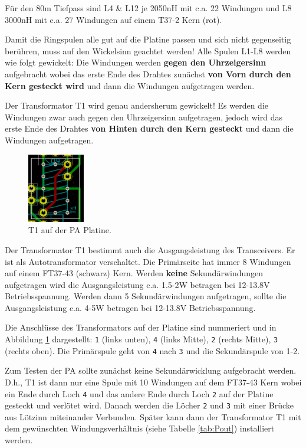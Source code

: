 \documentclass[10pt, a4paper]{paper}
\newcommand{\warn}[1]{{\color{red} #1}}
\newcommand{\con}[1]{\texttt{#1}}
\begin{document}
Für den 80m Tiefpass sind L4 \& L12 je 2050nH mit c.a. 22 Windungen und L8 3000nH mit c.a. 27 Windungen auf einem T37-2 Kern (rot).

Damit die Ringspulen alle gut auf die Platine passen und sich nicht gegenseitig berühren, \warn{muss auf den Wickelsinn geachtet werden!} Alle Spulen L1-L8 werden wie folgt gewickelt: Die Windungen werden \textbf{gegen den Uhrzeigersinn} aufgebracht wobei das erste Ende des Drahtes zunächst \textbf{von Vorn durch den Kern gesteckt wird} und dann die Windungen aufgetragen werden. 

\warn{Der Transformator T1 wird genau andersherum gewickelt!} Es werden die Windungen zwar auch gegen den Uhrzeigersinn aufgetragen, jedoch wird das erste Ende des Drahtes \textbf{von Hinten durch den Kern gesteckt} und dann die Windungen aufgetragen. 

\begin{figure}
 \centering
 \includegraphics[width=2.5cm]{fig/T1.png}
 \caption{T1 auf der PA Platine.} \label{fig:T1}
\end{figure}
Der Transformator T1 bestimmt auch die Ausgangsleistung des Transceivers. Er ist als Autotransformator verschaltet. Die Primärseite hat immer 8 Windungen auf einem FT37-43 (schwarz) Kern. Werden \textbf{keine} Sekundärwindungen aufgetragen wird die Ausgangsleistung c.a. 1.5-2W betragen bei 12-13.8V Betriebsspannung. Werden dann 5 Sekundärwindungen aufgetragen, sollte die Ausgangsleistung c.a. 4-5W betragen bei 12-13.8V Betriebsspannung.

Die Anschlüsse des Transformators auf der Platine sind nummeriert und in Abbildung \ref{fig:T1} dargestellt: \con{1} (links unten), \con{4} (links Mitte), \con{2} (rechts Mitte), \con{3} (rechts oben). Die Primärspule geht von \con{4} nach \con{3} und die Sekundärspule von 1-2. 

Zum Testen der PA sollte zunächst keine Sekundärwicklung aufgebracht werden. D.h., T1 ist dann nur eine Spule mit 10 Windungen auf dem FT37-43 Kern wobei ein Ende durch Loch \con{4} und das andere Ende durch Loch \con{2} auf der Platine gesteckt und verlötet wird. Danach werden die Löcher \con{2} und \con{3} mit einer Brücke aus Lötzinn miteinander Verbunden. Später kann dann der Transformator T1 mit dem gewünschten Windungsverhältnis (siehe Tabelle \ref{tab:Pout}) installiert werden.
\end{document}
